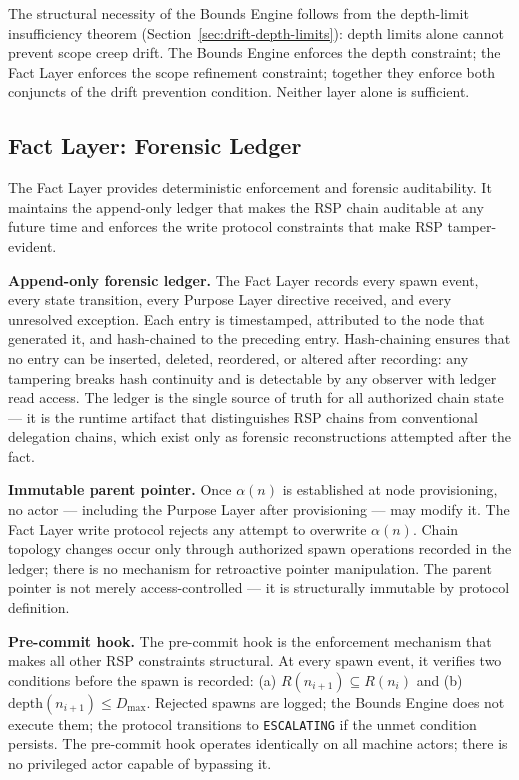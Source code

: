 The structural necessity of the Bounds Engine follows from the depth-limit insufficiency theorem (Section~\ref{sec:drift-depth-limits}): depth limits alone cannot prevent scope creep drift. The Bounds Engine enforces the depth constraint; the Fact Layer enforces the scope refinement constraint; together they enforce both conjuncts of the drift prevention condition. Neither layer alone is sufficient.

\subsection{Fact Layer: Forensic Ledger}
\label{sec:rs-fact-ledger}

The Fact Layer provides deterministic enforcement and forensic auditability. It maintains the append-only ledger that makes the RSP chain auditable at any future time and enforces the write protocol constraints that make RSP tamper-evident.

\medskip
\noindent\textbf{Append-only forensic ledger.} The Fact Layer records every spawn event, every state transition, every Purpose Layer directive received, and every unresolved exception. Each entry is timestamped, attributed to the node that generated it, and hash-chained to the preceding entry. Hash-chaining ensures that no entry can be inserted, deleted, reordered, or altered after recording: any tampering breaks hash continuity and is detectable by any observer with ledger read access. The ledger is the single source of truth for all authorized chain state — it is the runtime artifact that distinguishes RSP chains from conventional delegation chains, which exist only as forensic reconstructions attempted after the fact.

\medskip
\noindent\textbf{Immutable parent pointer.} Once $\alpha(n)$ is established at node provisioning, no actor — including the Purpose Layer after provisioning — may modify it. The Fact Layer write protocol rejects any attempt to overwrite $\alpha(n)$. Chain topology changes occur only through authorized spawn operations recorded in the ledger; there is no mechanism for retroactive pointer manipulation. The parent pointer is not merely access-controlled — it is structurally immutable by protocol definition.

\medskip
\noindent\textbf{Pre-commit hook.} The pre-commit hook is the enforcement mechanism that makes all other RSP constraints structural. At every spawn event, it verifies two conditions before the spawn is recorded: (a) $R(n_{i+1}) \subseteq R(n_i)$ and (b) $\mathrm{depth}(n_{i+1}) \leq D_{\mathrm{max}}$. Rejected spawns are logged; the Bounds Engine does not execute them; the protocol transitions to \texttt{ESCALATING} if the unmet condition persists. The pre-commit hook operates identically on all machine actors; there is no privileged actor capable of bypassing it.

